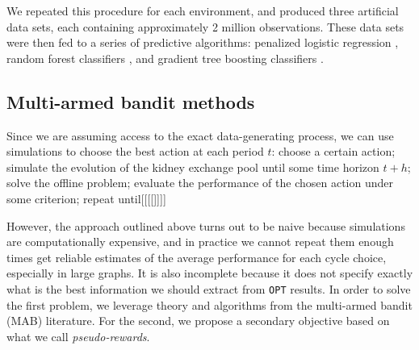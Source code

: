 We repeated this procedure for each environment, and produced three artificial data sets, each containing approximately 2 million observations. These data sets were then fed to a series of predictive algorithms: penalized logistic regression \citep{wu2009genome}, random forest classifiers \citep{breiman2001random}, and gradient tree boosting classifiers \citep{friedman2001greedy}. 



\subsection{Multi-armed bandit methods}

Since we are assuming access to the exact data-generating process, we can use simulations to choose the best action at each period $t$: choose a certain action; simulate the evolution of the kidney exchange pool until some time horizon $t + h$; solve the offline problem; evaluate the performance of the chosen action under some criterion; repeat until[[[[]]]]

However, the approach outlined above turns out to be naive because simulations are computationally expensive, and in practice we cannot repeat them enough times get reliable estimates of the average performance for each cycle choice, especially in large graphs. It is also incomplete because it does not specify exactly what is the best information we should extract from \texttt{OPT} results. In order to solve the first problem, we leverage theory and algorithms from the multi-armed bandit (MAB) literature. For the second, we propose a secondary objective based on what we call \emph{pseudo-rewards}.


